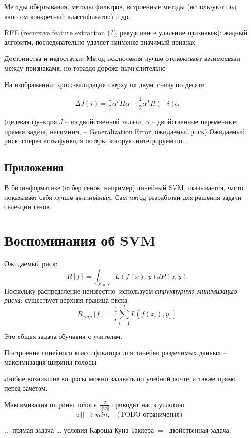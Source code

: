 \documentclass[main.tex]{subfiles}
\begin{document}
Методы обёртывания, методы фильтров, встроенные методы (используют под капотом конкретный классификатор) и др.

RFE (recursive feature extraction (?), рекурсивное удаление признаков): жадный алгоритм, последовательно удаляет наименее значимый признак.

Достоинства и недостатки:
Метод исключения лучше отслеживает взаимосвязи между признаками, но гораздо дороже вычислительно

На изображении: кросс-валидация сверху по двум, снизу по десяти

\[ \Delta J(i) = \frac{1}{2} \alpha^T H \alpha - \frac{1}{2} \alpha^T H(-i) \alpha \]

(целевая функция $ J $ -- из двойственной задачи, $ \alpha $ -- двойственные переменные; прямая задача, напомним, -- Generalization Error, ожидаемый риск)
Ожидаемый риск: сперва есть функция потерь, которую интегрируем по...

\subsection{Приложения}

В биоинформатике (отбор генов, например) линейный SVM, оказывается, часто показывает себя лучше нелинейных.
Сам метод разработан для решения задачи селекции генов.

\section{Воспоминания об SVM}

Ожидаемый риск:
\[ R[f] = \int_{X \times Y} L(f(x), y) dP(x,y) \]
Поскольку распределение неизвестно, используем \emph{структурную минимизацию риска}: существует верхняя граница риска
\[ R_{emp}[f] = \frac{1}{l} \sum_{i=1}^l L(f(x_i), y_i) \]


Это общая задача обучения с учителем.

Построение линейного классификатора для линейно разделимых данных -- максимизация ширины полосы.

\begin{leftbar}
	Любые возникшие вопросы можно задавать по учебной почте, а также прямо перед зачётом.
\end{leftbar}

Максимизация ширины полосы $ \frac{2}{|| w ||} $ приводит нас к условию 
\[ ||w|| \to min, \quad \text{(TODO ограничения)} \]

... прямая задача
... условия Кароша-Куна-Таккера $ \Rightarrow $ двойственная задача.
\end{document}
